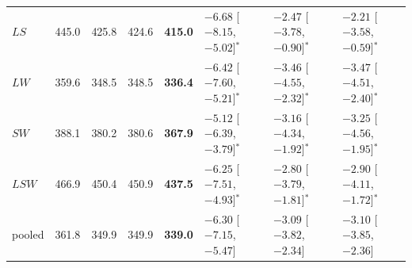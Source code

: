 \begin{tabular}{@{}l rrrr lll@{}}
$LS$ & 445.0 & 425.8 & 424.6 & \textbf{415.0} & $-6.68$ [$-8.15$, $-5.02$]$^{*}$ & $-2.47$ [$-3.78$, $-0.90$]$^{*}$ & $-2.21$ [$-3.58$, $-0.59$]$^{*}$ \\
$LW$ & 359.6 & 348.5 & 348.5 & \textbf{336.4} & $-6.42$ [$-7.60$, $-5.21$]$^{*}$ & $-3.46$ [$-4.55$, $-2.32$]$^{*}$ & $-3.47$ [$-4.51$, $-2.40$]$^{*}$ \\
$SW$ & 388.1 & 380.2 & 380.6 & \textbf{367.9} & $-5.12$ [$-6.39$, $-3.79$]$^{*}$ & $-3.16$ [$-4.34$, $-1.92$]$^{*}$ & $-3.25$ [$-4.56$, $-1.95$]$^{*}$ \\
$LSW$ & 466.9 & 450.4 & 450.9 & \textbf{437.5} & $-6.25$ [$-7.51$, $-4.93$]$^{*}$ & $-2.80$ [$-3.79$, $-1.81$]$^{*}$ & $-2.90$ [$-4.11$, $-1.72$]$^{*}$ \\
pooled & 361.8 & 349.9 & 349.9 & \textbf{339.0} & $-6.30$ [$-7.15$, $-5.47$] & $-3.09$ [$-3.82$, $-2.34$] & $-3.10$ [$-3.85$, $-2.36$] \\
\bottomrule
\end{tabular}
